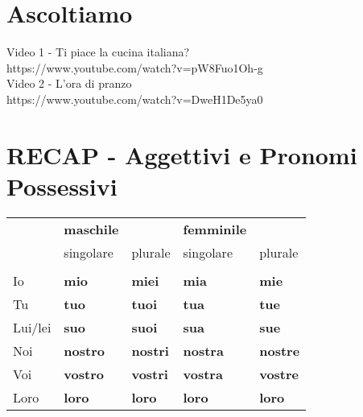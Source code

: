 \documentclass[letter,11pt]{article}
\begin{document}
\vskip 0.2in
\section*{Ascoltiamo}


\noindent Video 1 - Ti piace la cucina italiana?\\
https://www.youtube.com/watch?v=pW8Fuo1Oh-g \\

\noindent Video 2 - L'ora di pranzo\\
https://www.youtube.com/watch?v=DweH1De5ya0 \\


\vskip 0.2in
\section*{RECAP - Aggettivi e Pronomi Possessivi}
\vskip 0.2in

\begin{tabular}{ |p{3cm}| p{2cm}| p{2cm}| p{2cm}| p{2cm}| }
    & {\bf maschile} & & {\bf femminile} &  \\
    & singolare & plurale & singolare & plurale  \\
    \hline
    \hline
    & & & & \\ \hline
    Io   &  {\bf mio} & {\bf miei} & {\bf mia} & {\bf mie}  \\ \hline
    Tu   &  {\bf tuo} & {\bf tuoi} & {\bf tua} & {\bf tue}  \\ \hline
    Lui/lei &  {\bf suo} & {\bf suoi} & {\bf sua} & {\bf sue}  \\ \hline
    Noi  &  {\bf nostro} & {\bf nostri} & {\bf nostra} & {\bf nostre}  \\ \hline
    Voi  &  {\bf vostro} & {\bf vostri} & {\bf vostra} & {\bf vostre}  \\ \hline
    Loro &  {\bf loro} & {\bf loro} & {\bf loro} & {\bf loro}  \\ \hline
    \hline

\end{tabular}
\end{document}
